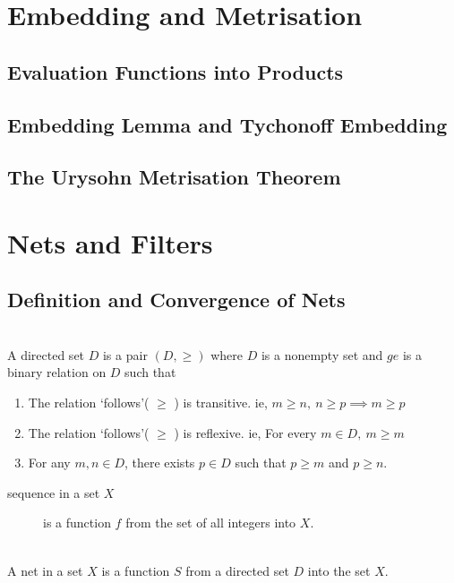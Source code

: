 \chapter{Embedding and Metrisation}
\section{Evaluation Functions into Products}
\section{Embedding Lemma and Tychonoff Embedding}
\section{The Urysohn Metrisation Theorem}

\chapter{Nets and Filters}
\section{Definition and Convergence of Nets}
\begin{definition}\cite[10.1.1]{joshi}\\
	A directed set \(D\) is a pair \( (D,\ge) \) where \( D \) is a nonempty set and  \( ge \) is a binary relation on \( D \) such that
	\begin{enumerate}
		\item The relation `follows'( \( \ge \) ) is transitive. ie,  \( m \ge n,\ n \ge p \implies m \ge p \)
		\item The relation `follows'( \( \ge \) ) is reflexive. ie, For every \( m \in D,\ m \ge m \)
		\item For any \( m,n \in D \), there exists \( p \in D \) such that \( p \ge m \) and \( p \ge n \).
	\end{enumerate}
\end{definition}

\begin{description}
	\item[sequence in a set \( X \)] is a function \( f \) from the set of all integers into \( X \).
\end{description}

\begin{definition}[Net]\cite[10.1.2]{joshi}\\
	A net in a set \( X \) is a function \( S \) from a directed set \( D \) into the set \( X \).
\end{definition}

